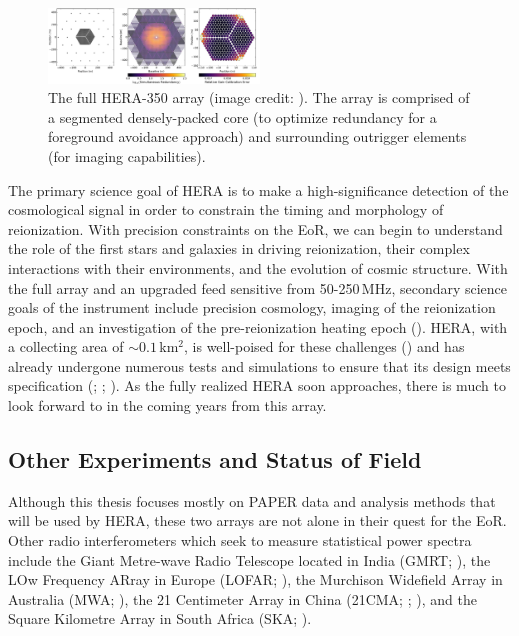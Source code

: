 \begin{figure}
    \centering
    \includegraphics[width=0.5\textwidth]{plots/hera_array.pdf}
    \caption{The full HERA-350 array (image credit: \citet{deboer_et_al2017}). The array is comprised of a segmented densely-packed core (to optimize redundancy for a foreground avoidance approach) and surrounding outrigger elements (for imaging capabilities).}
    \label{fig:hera_array}
\end{figure}

The primary science goal of HERA is to make a high-significance detection of the cosmological signal in order to constrain the timing and morphology of reionization. With precision constraints on the EoR, we can begin to understand the role of the first stars and galaxies in driving reionization, their complex interactions with their environments, and the evolution of cosmic structure. With the full array and an upgraded feed sensitive from 50-250\,MHz, secondary science goals of the instrument include precision cosmology, imaging of the reionization epoch, and an investigation of the pre-reionization heating epoch (\citealt{deboer_et_al2017}). HERA, with a collecting area of $\sim0.1$\,km$^{2}$, is well-poised for these challenges (\citealt{pober_et_al2014}) and has already undergone numerous tests and simulations to ensure that its design meets specification (\citealt{neben_et_al2016}; \citealt{ewall-wice_et_al2017}; \citealt{patra_et_al2018}). As the fully realized HERA soon approaches, there is much to look forward to in the coming years from this array.

\subsection{Other Experiments and Status of Field}

Although this thesis focuses mostly on PAPER data and analysis methods that will be used by HERA, these two arrays are not alone in their quest for the EoR. Other radio interferometers which seek to measure statistical power spectra include the Giant Metre-wave Radio Telescope located in India (GMRT; \citealt{paciga_et_al2013}), the LOw Frequency ARray in Europe (LOFAR; \citealt{van_haarlem_et_al2013}), the Murchison Widefield Array in Australia (MWA; \citealt{tingay_et_al2013}), the 21 Centimeter Array in China (21CMA; \citealt{peterson_et_al2004}; \citealt{wu2009}), and the Square Kilometre Array in South Africa (SKA; \citealt{koopmans_et_al2015}).

